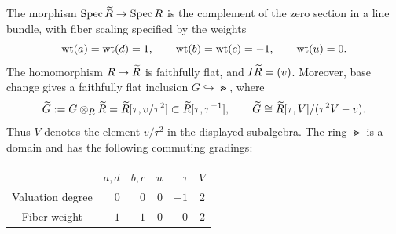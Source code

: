 \begin{proposition}
\label{prop:principalization}
The morphism $\operatorname{Spec}\widetilde R\to\operatorname{Spec} R$ is the complement of the zero
section in a line bundle, with fiber scaling specified by the weights
\[
 \operatorname{wt}(a)=\operatorname{wt}(d)=1,\qquad
 \operatorname{wt}(b)=\operatorname{wt}(c)=-1,\qquad \operatorname{wt}(u)=0.
\]
The homomorphism $R\to\widetilde R$ is faithfully flat, and
$I\widetilde R=(v)$. Moreover, base change gives a faithfully flat inclusion
$G\hookrightarrow\Gt$, where
\begin{equation}
\label{bun:pullback-algebra}
 \widetilde G:=G\otimes_R\widetilde R
   =\widetilde R[\tau,v/\tau^2]\subset\widetilde R[\tau,\tau^{-1}],\qquad
 \widetilde G\cong\widetilde R[\tau,V]/(\tau^2V-v).
\end{equation}
Thus $V$ denotes the element $v/\tau^2$ in the displayed subalgebra.
The ring $\Gt$ is a domain and has the following commuting gradings:
\begin{center}
\begin{tabular}{c@{\qquad}rrrrr}
\toprule
 & $a,d$ & $b,c$ & $u$ & $\tau$ & $V$\\
\midrule
Valuation degree & $0$ & $0$ & $0$ & $-1$ & $2$\\
Fiber weight & $1$ & $-1$ & $0$ & $0$ & $2$\\
\bottomrule
\end{tabular}
\end{center}
\end{proposition}

